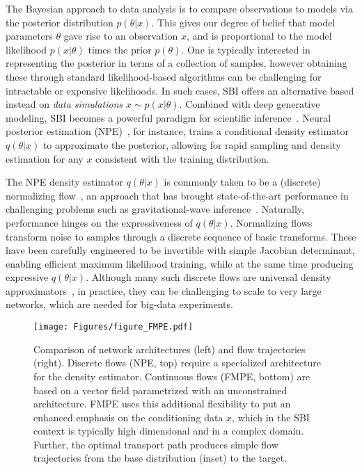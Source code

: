\documentclass{article}
\theoremstyle{remark}
\begin{document}
The Bayesian approach to data analysis is to compare observations to models via the posterior distribution $p(\theta|x)$. This gives our degree of belief that model parameters $\theta$ gave rise to an observation $x$, and is proportional to the model likelihood $p(x|\theta)$ times the prior $p(\theta)$. One is typically interested in representing the posterior in terms of a collection of samples, however obtaining these through standard likelihood-based algorithms can be challenging for intractable or expensive likelihoods. In such cases, SBI offers an alternative based instead on \emph{data simulations} $x \sim p(x|\theta)$. Combined with deep generative modeling, SBI becomes a powerful paradigm for scientific inference~\cite{Cranmer:2019eaq}. Neural posterior estimation (NPE)~\citep{papamakarios2016fast,lueckmann2017flexible,greenberg2019automatic}, for instance, trains a conditional density estimator $q(\theta|x)$ to approximate the posterior, allowing for rapid sampling and density estimation for any $x$ consistent with the training distribution.

The NPE density estimator $q(\theta|x)$ is commonly taken to be a (discrete) normalizing flow~\citep{rezende2015variational,papamakarios2019normalizing}, an approach that has brought state-of-the-art performance in challenging problems such as gravitational-wave inference~\cite{Dax:2021tsq}. Naturally, performance hinges on the expressiveness of $q(\theta|x)$. Normalizing flows transform noise to samples through a discrete sequence of basic transforms. These have been carefully engineered to be invertible with simple Jacobian determinant, enabling efficient maximum likelihood training, while at the same time producing expressive $q(\theta|x)$. Although many such discrete flows are universal density approximators~\cite{papamakarios2019normalizing}, in practice, they can be challenging to scale to very large networks, which are needed for big-data experiments.

\begin{figure}
    \texttt{[image: Figures/figure\_FMPE.pdf]}
    \caption{\label{fig:intro-flows}
    Comparison of network architectures (left) and flow trajectories (right). Discrete flows (NPE, top) require a specialized architecture for the density estimator. Continuous flows (FMPE, bottom) are based on a vector field parametrized with an unconstrained architecture. FMPE uses this additional flexibility to put an enhanced emphasis on the conditioning data $x$, which in the SBI context is typically high dimensional and in a complex domain. Further, the optimal transport path produces simple flow trajectories from the base distribution (inset) to the target.
    }
\end{figure}
\end{document}
